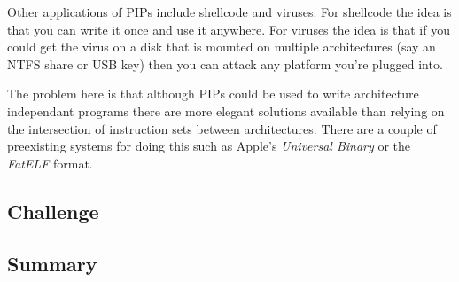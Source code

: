 Other applications of PIPs include shellcode and viruses. For shellcode
the idea is that you can write it once and use it anywhere. For viruses
the idea is that if you could get the virus on a disk that is mounted on
multiple architectures (say an NTFS share or USB key) then you can
attack any platform you're plugged into.

The problem here is that although PIPs could be used to write
architecture independant programs there are more elegant solutions
available than relying on the intersection of instruction sets between
architectures. There are a couple of preexisting systems for doing this
such as Apple's \emph{Universal Binary} or the
\emph{FatELF}\citep{FatELF} format.

\subsection{Challenge}

\subsection{Summary}

